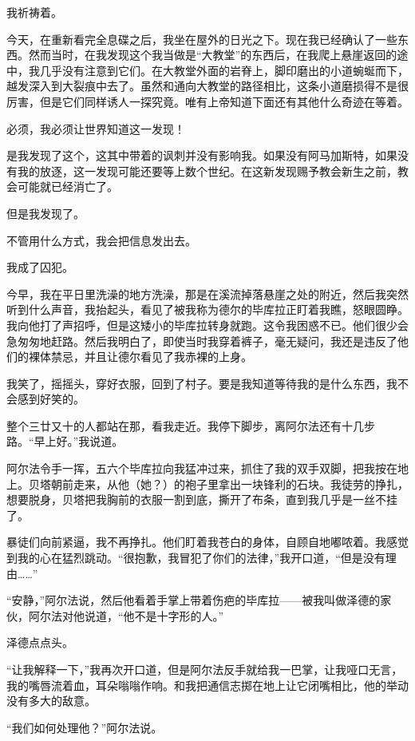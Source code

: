 \documentclass[AutoFakeBold=true]{book}
\begin{document}
我祈祷着。

今天，在重新看完全息碟之后，我坐在屋外的日光之下。现在我已经确认了一些东西。然而当时，在我发现这个我当做是``大教堂''的东西后，在我爬上悬崖返回的途中，我几乎没有注意到它们。在大教堂外面的岩脊上，脚印磨出的小道蜿蜒而下，越发深入到大裂痕中去了。虽然和通向大教堂的路径相比，这条小道磨损得不是很厉害，但是它们同样诱人一探究竟。唯有上帝知道下面还有其他什么奇迹在等着。

必须，我必须让世界知道这一发现！

是我发现了这个，这其中带着的讽刺并没有影响我。如果没有阿马加斯特，如果没有我的放逐，这一发现可能还要等上数个世纪。在这新发现赐予教会新生之前，教会可能就已经消亡了。

但是我发现了。

不管用什么方式，我会把信息发出去。

\vspace*{1em}{\kaishu 第一百零七日：}

我成了囚犯。

今早，我在平日里洗澡的地方洗澡，那是在溪流掉落悬崖之处的附近，然后我突然听到什么声音，我抬起头，看见了被我称为德尔的毕库拉正盯着我瞧，怒眼圆睁。我向他打了声招呼，但是这矮小的毕库拉转身就跑。这令我困惑不已。他们很少会急匆匆地赶路。然后我明白了，即使当时我穿着裤子，毫无疑问，我还是违反了他们的裸体禁忌，并且让德尔看见了我赤裸的上身。

我笑了，摇摇头，穿好衣服，回到了村子。要是我知道等待我的是什么东西，我不会感到好笑的。

整个三廿又十的人都站在那，看我走近。我停下脚步，离阿尔法还有十几步路。``早上好。''我说道。

阿尔法令手一挥，五六个毕库拉向我猛冲过来，抓住了我的双手双脚，把我按在地上。贝塔朝前走来，从他（她？）的袍子里拿出一块锋利的石块。我徒劳的挣扎，想要脱身，贝塔把我胸前的衣服一割到底，撕开了布条，直到我几乎是一丝不挂了。

暴徒们向前紧逼，我不再挣扎。他们盯着我苍白的身体，自顾自地嘟哝着。我感觉到我的心在猛烈跳动。``很抱歉，我冒犯了你们的法律，''我开口道，``但是没有理由……''

``安静，''阿尔法说，然后他看着手掌上带着伤疤的毕库拉——被我叫做泽德的家伙，阿尔法对他说道，``他不是十字形的人。''

泽德点点头。

``让我解释一下，''我再次开口道，但是阿尔法反手就给我一巴掌，让我哑口无言，我的嘴唇流着血，耳朵嗡嗡作响。和我把通信志掷在地上让它闭嘴相比，他的举动没有多大的敌意。

``我们如何处理他？''阿尔法说。
\end{document}
